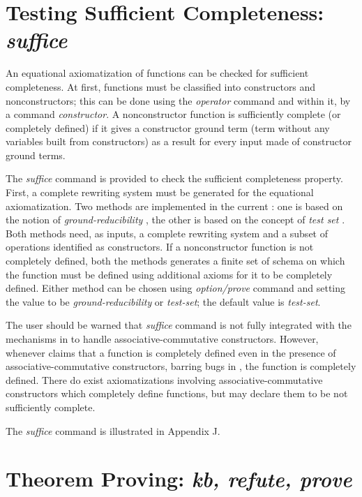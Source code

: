 \section{Testing Sufficient Completeness: {\em suffice}} 

An equational axiomatization of functions can be checked for
sufficient completeness. At first, functions must be classified into
constructors and nonconstructors;
this can be done
using the {\em operator} command and within
it, by a command {\em constructor}.
A nonconstructor function is
sufficiently complete (or completely defined) if it gives a
constructor ground term (term without any variables built from
constructors) as a result for every input made of constructor ground
terms.

The {\em suffice} command is provided to check the sufficient
completeness property.  First, a complete rewriting system must be
generated for the equational axiomatization.  Two methods are
implemented in the current \RRL: one is based on the notion of {\em
ground-reducibility} \cite{JK86}, the other is based on the
concept of {\em test set} \cite{KNZ86}. Both methods need, as inputs,
a complete rewriting system and a subset of operations identified as
constructors.  If a nonconstructor function is not completely defined,
both the methods generates a finite set of schema on which the
function must be defined using additional axioms for it to be
completely defined. Either method can be chosen using
{\em option/prove} command and setting the value
to be {\em ground-reducibility} or {\em test-set}; the default
value is {\em test-set}.

The user should be warned that {\em suffice} command is not fully
integrated with the mechanisms in \RRL to handle
associative-commutative constructors. However, whenever \RRL claims
that a function is completely defined even in the presence of
associative-commutative constructors, barring bugs in \ERRL, the
function is completely defined. There do exist axiomatizations
involving associative-commutative constructors which completely define
functions, but \RRL may declare them to be not sufficiently complete.
  
The {\em suffice} command is illustrated in Appendix J.

\section {Theorem Proving: {\em kb, refute, prove}}

